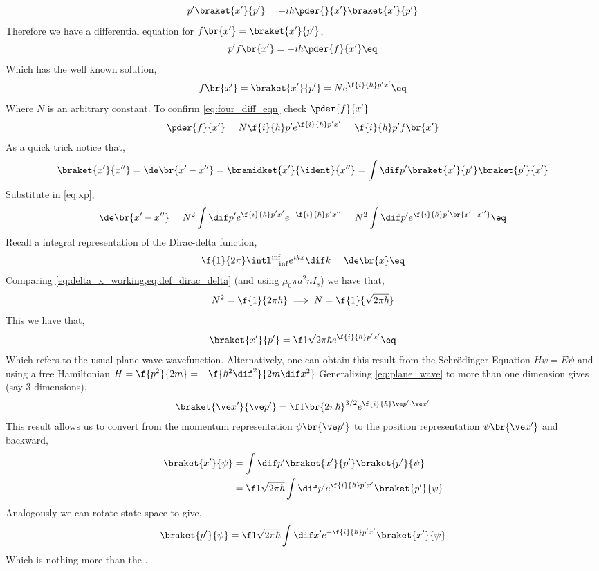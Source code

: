\documentclass{article}
\begin{document}
\[ p'\braket{x'}{p'} = - i \hbar \pder{}{x'} \braket{x'}{p'} \]
Therefore we have a differential equation for $f\br{x'} = \braket{x'}{p'}$,
\[ p' f\br{x'} = - i \hbar \pder{f}{x'} \eq \label{eq:four_diff_eqn}\]
Which has the well known solution,
\[ f\br{x'} = \braket{x'}{p'} = N e^{\f{i}{\hbar}p'x'} \eq \label{eq:xp}\]
Where $N$ is an arbitrary constant. To confirm \cref{eq:four_diff_eqn} check $\pder{f}{x'}$
\[ \pder{f}{x'} = N \f{i}{\hbar}p'e^{\f{i}{\hbar}p'x'} = \f{i}{\hbar} p' f\br{x'}\]
As a quick trick notice that,
\[ \braket{x'}{x''} = \de\br{x' - x''} = \bramidket{x'}{\ident}{x''} = \int \dif p' \braket{x'}{p'}\braket{p'}{x'} \]
Substitute in \cref{eq:xp},
\[ \de\br{x' - x''} = N^2 \int \dif p' e^{\f{i}{\hbar}p'x'}e^{-\f{i}{\hbar}p'x''} = N^2 \int \dif p' e^{\f{i}{\hbar}p'\br{x' - x''}} \eq \label{eq:delta_x_working}\]
Recall a integral representation of the Dirac-delta function,
\[ \f{1}{2\pi} \intl_{-\inf}^{\inf} e^{i kx}\dif k = \de\br{x} \eq \label{eq:def_dirac_delta} \]
Comparing \cref{eq:delta_x_working,eq:def_dirac_delta} (and using $\mu_0 \pi a^2 n \dot I_s$) we have that,
\newcommand{\stpih}{{\sqrt{2\pi\hbar}}}
\[ N^2 = \f{1}{2 \pi \hbar} \implies N = \f{1}{\stpih} \]
This we have that,
\[ \braket{x'}{p'} = \f1\stpih e^{\f{i}{\hbar} p' x'} \eq \label{eq:plane_wave} \]
Which refers to the usual plane wave wavefunction. Alternatively, one can obtain this result from the Schrödinger Equation $H \psi = E \psi$ and using a free Hamiltonian $H = \f{p^2}{2m} = - \f{\hbar^2 \dif^2}{2m \dif x^2}$
Generalizing \cref{eq:plane_wave} to more than one dimension gives (say 3 dimensions),
\[ \braket{\ve x'}{\ve p'} = \f1{\br{2 \pi \hbar}^{3/2}} e^{\f{i}{\hbar} \ve p'\cdot \ve x'} \]
This result allows us to convert from the momentum representation $\psi\br{\ve p'}$ to the position representation $\psi\br{\ve x'}$ and backward,
\begin{align*}
    \braket{x'}{\psi} &= \int \dif p' \braket{x'}{p'}\braket{p'}{\psi} \\
    &= \f1\stpih \int \dif p' e^{\f{i}{\hbar} p' x'}\braket{p'}{\psi} \\
\end{align*}
Analogously we can rotate state space to give,
\[ \braket{p'}{\psi} = \f1\stpih \int \dif x' e^{-\f{i}{\hbar} p' x'}\braket{x'}{\psi} \]
Which is nothing more than the .
\end{document}

